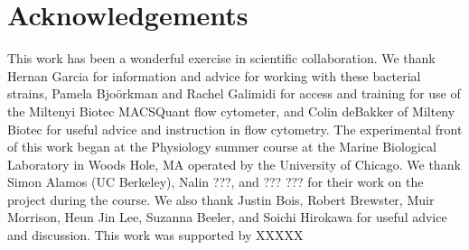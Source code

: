 \pagebreak
\section*{Acknowledgements }

This work has been a wonderful exercise in scientific collaboration. We thank
Hernan Garcia for information and advice for working with these bacterial
strains, Pamela Bjo\"{o}rkman and Rachel Galimidi for access and training for
use of the Miltenyi Biotec MACSQuant flow cytometer, and Colin deBakker of
Milteny Biotec for useful advice and instruction in flow cytometry. The
experimental front of this work began at the Physiology summer course at the
Marine Biological Laboratory in Woods Hole, MA operated by the University of
Chicago. We thank Simon Alamos (UC Berkeley), Nalin ???, and ??? ??? for their
work on the project during the course. We also thank Justin Bois, Robert
Brewster, Muir Morrison, Heun Jin Lee, Suzanna Beeler, and Soichi Hirokawa for
useful advice and discussion. This work was supported by XXXXX
